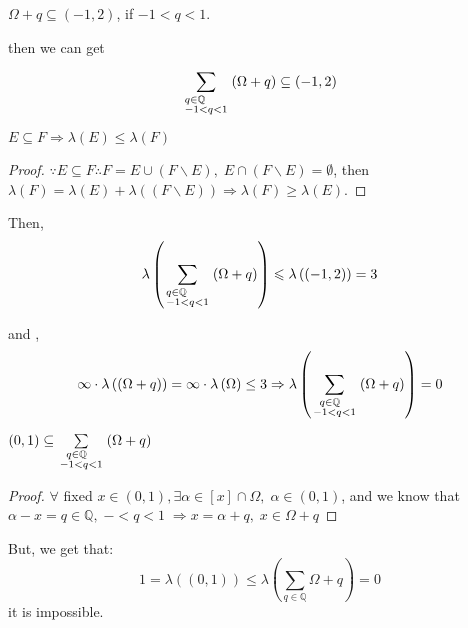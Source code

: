 \begin{claim}
	$\Omega  + q \subseteq \left( { - 1,2} \right)$, if  $ -1 < q < 1 $.
\end{claim}
 
then we can get 

\begin{equation}
\sum\limits_{\scriptstyle q \in \mathbb{Q} \hfill \atop 
	\scriptstyle  - 1 < q < 1 \hfill}  {\left( {\Omega  + q} \right)}  \subseteq \left( { - 1,2} \right)
\end{equation}

\begin{claim}
	$E \subseteq F \Rightarrow \lambda \left( E \right) \leqslant \lambda \left( F \right)$
\end{claim}
\begin{proof}
	$\because E \subseteq F\therefore F = E \cup \left( {F\backslash E} \right),\;E \cap \left( {F\backslash E} \right) = \emptyset $, then
	$\lambda \left( F \right) = \lambda \left( E \right) + \lambda \left( {\left( {F\backslash E} \right)} \right) \Rightarrow \lambda \left( F \right) \geqslant \lambda \left( E \right)$.
\end{proof}
Then,  
\begin{equation}
\lambda \left( {\sum\limits_{\scriptstyle q \in \mathbb{Q} \hfill \atop 
		\scriptstyle  - 1 < q < 1 \hfill}  {\left( {\Omega  + q} \right)} } \right) \leqslant \lambda \left( {\left( { - 1,2} \right)} \right) = 3
\end{equation}

and ,
\begin{equation}
\infty \cdot \lambda \left( {\left( {\Omega  + q} \right)} \right) =  \infty \cdot \lambda \left( \Omega  \right) \le 3 \Rightarrow \lambda \left( {\sum\limits_{\scriptstyle \;\;q \in \mathbb{Q} \hfill \atop 
		\scriptstyle  - 1 < q < 1 \hfill}  {\left( {\Omega  + q} \right)} } \right) = 0
\end{equation}

\begin{claim}
	$\left( {0,1} \right) \subseteq \sum\limits_{\scriptstyle \;\;q \in \mathbb{Q} \hfill \atop 
		\scriptstyle  - 1 < q < 1 \hfill}  {\left( {\Omega  + q} \right)} $
\end{claim}

\begin{proof}
	$ \forall $ fixed $  x \in \left( {0,1} \right), \exists \alpha  \in \left[ x \right] \cap \Omega ,\;\alpha  \in \left( {0,1} \right) $, and we know that $\alpha  - x = q \in \mathbb{Q},\; -  < q < 1\; \Rightarrow x = \alpha  + q,\;x \in \Omega  + q$
\end{proof}

But, we get that: 
\begin{equation}
1 = \lambda \left( {\left( {0,1} \right)} \right) \leqslant \lambda \left( {\sum\limits_{q \in \mathbb{Q}} {\Omega  + q} } \right) = 0
\end{equation}
it is impossible.